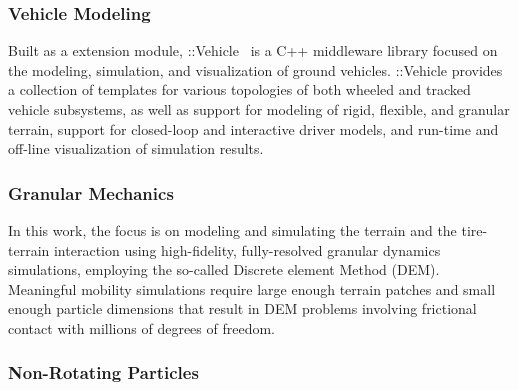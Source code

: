 \documentclass[12pt,twocolumn]{article}
\newcommand{\CHRONO}{{\sffamily{{Chrono}}}}
\newcommand{\ChronoVehicle}{{\sffamily{Chrono}}::Vehicle}
\begin{document}


\subsubsection{Vehicle Modeling}\label{sss:Chrono_Vehicle}
	
Built as a {\CHRONO} extension module, {\ChronoVehicle}~\cite{TR2016-10RaduChronoVehicle} is a C++ middleware library focused on the modeling, simulation, and visualization of ground vehicles.
%
{\ChronoVehicle} provides a collection of templates for various topologies of both wheeled and tracked vehicle subsystems, as well as support for modeling of rigid, flexible, and granular terrain, support for closed-loop and interactive driver models, and run-time and off-line visualization of simulation results.




\subsubsection{Granular Mechanics }\label{sss:GranMech}

In this work, the focus is on modeling and simulating the terrain and the tire-terrain interaction using high-fidelity, fully-resolved granular dynamics simulations, employing the so-called Discrete element Method (DEM).  Meaningful mobility simulations require large enough terrain patches and small enough particle dimensions that result in DEM problems involving frictional contact with millions of degrees of freedom.



\subsubsection{Non-Rotating Particles}\label{sss:NonRot}

\end{document}
